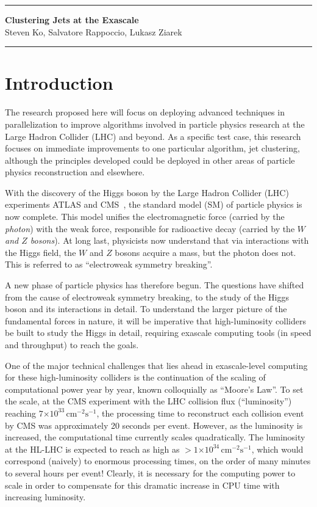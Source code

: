 \documentclass[times,11pt]{article}
\newcommand{\instlumiA}     {\ensuremath{\times 10^{33} \,\mathrm{cm}^{-2} \mathrm{s}^{-1}}}
\newcommand{\instlumiB}     {\ensuremath{\times 10^{34} \,\mathrm{cm}^{-2} \mathrm{s}^{-1}}}
\begin{document}
\newpage



\hrule
\begin{center}
{\bf \Large Clustering Jets at the Exascale}\\
Steven Ko, Salvatore Rappoccio, Lukasz Ziarek
\end{center}
\hrule
\bigskip

\section{Introduction}

The research proposed here will focus on deploying advanced techniques
in parallelization to improve algorithms involved in particle physics
research at the Large Hadron Collider (LHC) and beyond. As a
specific test case, this research focuses on immediate improvements to
one particular algorithm, jet
clustering, although the principles
developed could be deployed in other areas of particle physics
reconstruction and elsewhere. 

With the discovery of the Higgs boson 
by the Large Hadron Collider (LHC)
experiments ATLAS and CMS~\cite{higgs_cms,higgs_atlas}, the
standard model (SM) of particle
physics is now complete. This model unifies the electromagnetic force
(carried by the {\em photon}) with the weak force, responsible for
radioactive decay (carried by the {\em $W$ and $Z$ bosons}).
At long last,
physicists now understand that via interactions with the Higgs field,
the $W$ and $Z$ bosons acquire a mass, but the photon does not. 
This is referred to as ``electroweak symmetry breaking''. 


A new phase of particle physics has therefore begun. 
The questions have shifted from the cause of electroweak symmetry
breaking, to the study of the Higgs boson and its interactions in
detail. To understand the larger picture of the fundamental forces in
nature, it will be imperative that high-luminosity colliders be built
to study the Higgs in detail, requiring exascale computing tools (in
speed and throughput) to reach the goals. 


One of the major technical challenges that lies ahead in
exascale-level computing for these high-luminosity colliders is the
continuation of the scaling of computational power year by year, known
colloquially as ``Moore's Law''. 
To set the scale, at the CMS experiment
with the LHC collision flux (``luminosity'') reaching
$7\instlumiA$, the processing
time to reconstruct each collision event by CMS was approximately 20
seconds per event. However, as the luminosity is
increased, the computational time currently scales
quadratically. The luminosity at the HL-LHC is expected to reach as
high as $>1\instlumiB$, which would correspond (naively) to enormous
processing times, on the order of many minutes to several
hours per event! Clearly, it is necessary for the
computing power to scale in order to compensate for this dramatic
increase in CPU time with increasing luminosity. 
\end{document}
